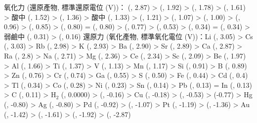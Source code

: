 \documentclass[a4paper,12pt]{report}
\begin{document}
氧化力 (還原產物, 標準還原電位 (V))： (, 2.87) >  (, 1.92) >  (, 1.78) >  (, 1.61) > 酸中  (, 1.52) >  (, 1.36) > 酸中  (, 1.33) >  (, 1.21) >  (, 1.07) >  (, 1.00) >  (, 0.96) >  (, 0.85) >  (, 0.80) =  (, 0.80) >  (, 0.77) >  (, 0.53) >  (, 0.34) =  (, 0.34) > 弱鹼中  (, 0.31) >  (, 0.16)
還原力 (氧化產物, 標準氧化電位 (V))：Li (, 3.05) > Cs (, 3.03) > Rb (, 2.98) > K (, 2.93) > Ba (, 2.90) > Sr (, 2.89) > Ca (, 2.87) > Ra (, 2.8) > Na (, 2.71) > Mg (, 2.36) > Ce (, 2.34) > Sc (, 2.09) > Be (, 1.97) > Al (, 1.66) > Ti (, 1.37) > V (, 1.13) > Mn (, 1.17) > Si (, 0.91) > B (, 0.89) > Zn (, 0.76) > Cr (, 0.74) > Ga (, 0.55) > S (, 0.50) > Fe (, 0.44) > Cd (, 0.4) > Tl (, 0.34) > Co (, 0.28) > Ni (, 0.23) > Sn (, 0.14) > Pb (, 0.13) = In (, 0.13) > C (, 0.11) > H$_2$ (, 0.0000) >  (, -0.16) > Cu (, -0.18) >  (, -0.53) >  (-0.77) > Hg (, -0.80) > Ag (, -0.80) > Pd (, -0.92) >  (, -1.07) > Pt (, -1.19) >  (, -1.36) > Au (, -1.42) >  (, -1.61) >  (, -1.92) >  (, -2.87)
\end{document}
